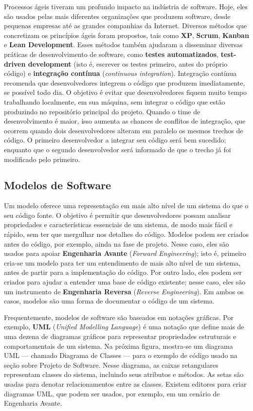\documentclass[
  11pt,
  twoside]{book}
\begin{document}
Processos ágeis tiveram um profundo impacto na indústria de software.
Hoje, eles são usados pelas mais diferentes organizações que produzem
software, desde pequenas empresas até as grandes companhias da Internet.
Diversos métodos que concretizam os princípios ágeis foram propostos,
tais como \textbf{XP}, \textbf{Scrum}, \textbf{Kanban} e \textbf{Lean
Development}. Esses métodos também ajudaram a disseminar diversas
práticas de desenvolvimento de software, como \textbf{testes
automatizados}, \textbf{test-driven development} (isto é, escrever os
testes primeiro, antes do próprio código) e \textbf{integração contínua}
(\emph{continuous integration}). Integração contínua recomenda que
desenvolvedores integrem o código que produzem imediatamente, se
possível todo dia. O objetivo é evitar que desenvolvedores fiquem muito
tempo trabalhando localmente, em sua máquina, sem integrar o código que
estão produzindo no repositório principal do projeto. Quando o time de
desenvolvimento é maior, isso aumenta as chances de conflitos de
integração, que ocorrem quando dois desenvolvedores alteram em paralelo
os mesmos trechos de código. O primeiro desenvolvedor a integrar seu
código será bem sucedido; enquanto que o segundo desenvolvedor será
informado de que o trecho já foi modificado pelo primeiro.

\hypertarget{modelos-de-software}{%
\subsection{Modelos de Software}\label{modelos-de-software}}

 Um modelo oferece uma representação em mais
alto nível de um sistema do que o seu código fonte. O objetivo é
permitir que desenvolvedores possam analisar propriedades e
características essenciais de um sistema, de modo mais fácil e rápido,
sem ter que mergulhar nos detalhes do código. Modelos podem ser criados
antes do código, por exemplo, ainda na fase de projeto. Nesse caso, eles
são usados para apoiar \textbf{Engenharia Avante} (\emph{Forward
Engineering}); isto é, primeiro cria-se um modelo para ter um
entendimento de mais alto nível de um sistema, antes de partir para a
implementação do código. Por outro lado, eles podem ser criados para
ajudar a entender uma base de código existente; nesse caso, eles são um
instrumento de \textbf{Engenharia Reversa} (\emph{Reverse Engineering}).
Em ambos os casos, modelos são uma forma de documentar o código de um
sistema.

 Frequentemente, modelos de software são baseados em notações
gráficas. Por exemplo, \textbf{UML} (\emph{Unified Modelling Language})
é uma notação que define mais de uma dezena de diagramas gráficos para
representar propriedades estruturais e comportamentais de um sistema. Na
próxima figura, mostra-se um diagrama UML --- chamado Diagrama de
Classes --- para o exemplo de código usado na seção sobre Projeto de
Software. Nesse diagrama, as caixas retangulares representam classes do
sistema, incluindo seus atributos e métodos. As setas são usadas para
denotar relacionamentos entre as classes. Existem editores para criar
diagramas UML, que podem ser usados, por exemplo, em um cenário de
Engenharia Avante.
\end{document}
